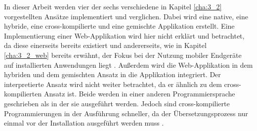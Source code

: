 In dieser Arbeit werden vier der sechs verschiedene in Kapitel \ref{cha:3_2} vorgestellten Ansätze implementiert und verglichen. Dabei wird eine native, eine hybride, eine cross-kompilierte und eine gemischte Applikation erstellt. Eine Implementierung einer Web-Applikation wird hier nicht erklärt und betrachtet, da diese einerseits bereits existiert und andererseits, wie in Kapitel \ref{cha:3_2_web} bereits erwähnt, der Fokus bei der Nutzung mobiler Endgeräte auf installierten Anwendungen liegt \cite{report_webusage}. Außerdem wird die Web-Applikation in dem hybriden und dem gemischten Ansatz in die Applikation integriert. Der interpretierte Ansatz wird nicht weiter betrachtet, da er ähnlich zu dem cross-kompilierten Ansatz ist. Beide werden in einer anderen Programmiersprache geschrieben als in der sie ausgeführt werden. Jedoch sind cross-kompilierte Programmierungen in der Ausführung schneller, da der Übersetzungsprozess nur einmal vor der Installation ausgeführt werden muss \cite{interpreted_vs_compiled}.
